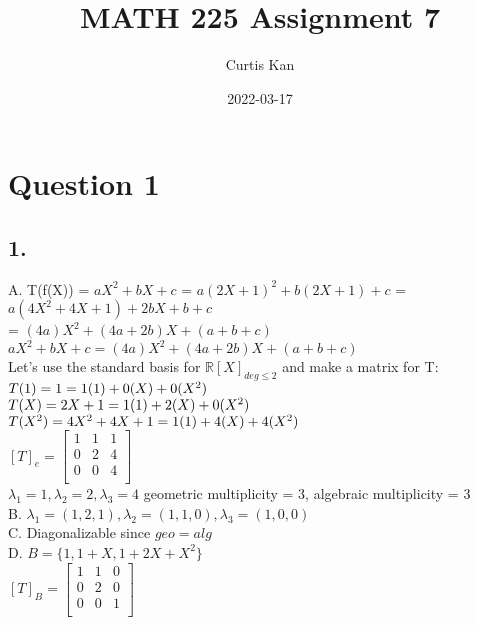 \documentclass{article}
\title{MATH 225 Assignment 7}
\author{Curtis Kan}
\date{2022-03-17}
\newcommand{\R}[0]{\mathbb{R}}
\begin{document}
\maketitle

\section*{Question 1}
\subsection*{1.}
A. T(f(X)) = $aX^2 + bX + c$ = $a(2X + 1)^2 + b(2X + 1) + c$ = $a(4X^2 + 4X + 1) + 2bX + b + c$ \\ = $(4a)X^2 + (4a + 2b)X + (a + b + c)$
\\$aX^2 + bX + c = (4a)X^2 + (4a + 2b)X + (a + b + c)$
\\Let's use the standard basis for $\R[X]_{deg \leq 2}$ and make a matrix for T:
\\$T(1) = 1
\\ = 1(1) + 0(X) + 0(X^2)$ 
\\$T(X) = 2X + 1
\\ = 1(1) + 2(X) + 0(X^2)$
\\$T(X^2) = 4X^2 + 4X + 1
\\ = 1(1) + 4(X) + 4(X^2)$
\\[10px]
$[T]_e = \begin{bmatrix}
1 & 1 & 1 \\
0 & 2 & 4 \\
0 & 0 & 4\\
\end{bmatrix}$
\\$\lambda_1 = 1, \lambda_2 = 2, \lambda_3 = 4$ geometric multiplicity = 3, algebraic multiplicity  = 3
\\B. $\lambda_1 = (1, 2, 1), \lambda_2 = (1, 1, 0), \lambda_3 = (1, 0, 0)$
\\C. Diagonalizable since $geo = alg$
\\D. $B = \{1, 1 + X, 1 + 2X + X^2\}$
\\$[T]_B = \begin{bmatrix}
1 & 1 & 0 \\
0 & 2 & 0 \\
0 & 0 & 1\\
\end{bmatrix}$
\end{document}
